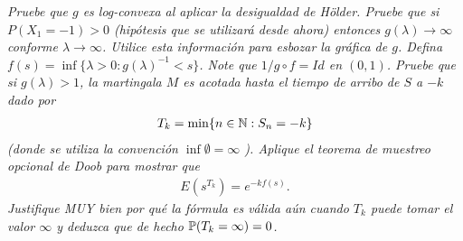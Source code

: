 \emph{
	Pruebe que $g$ es log-convexa al aplicar la desigualdad de H\"older. Pruebe que si $P(X_1=-1)>0$ (hip\'otesis que se utilizar\'a desde ahora) 
	entonces $g(\lambda)\to\infty$ conforme $\lambda\to\infty$. Utilice esta informaci\'on para esbozar la gr\'afica de $g$. 
	Defina $ f(s)=\inf \{ \lambda>0:g(\lambda)^{-1} < s\} $. Note que $1/g\circ f=Id$ en $(0,1)$. Pruebe que si $g(\lambda)>1$, 
	la martingala $M$ es acotada hasta el tiempo de arribo de $S$ a $-k$ dado por 
	\begin{align}
		T_k =\min \{n\in\mathbb{N}:S_n=-k\} 
	\end{align}
	(donde se utiliza la convenci\'on $\inf\emptyset=\infty$ ). Aplique el teorema de muestreo opcional de Doob para mostrar que 
	\begin{align}
		E(s^{T_k})=e^{-k f(s)}.
	\end{align}
	Justifique MUY bien por qu\'e la f\'ormula es válida aún cuando $T_k$ puede tomar el valor $\infty$ y deduzca que de hecho $ \mathbb{P}  (T_k=\infty)=0$.
}